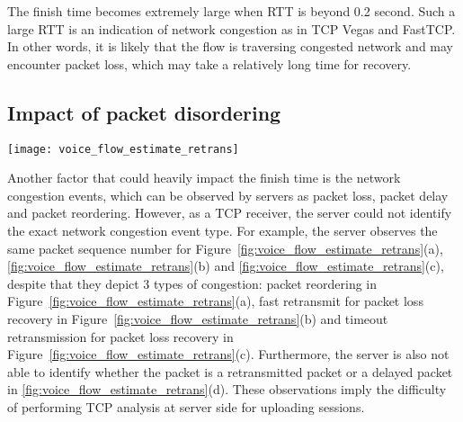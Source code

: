 The finish time becomes extremely large when RTT is beyond 0.2 second. Such a large RTT is an indication of network congestion as in TCP Vegas\cite{brakmo1995tcp} and FastTCP\cite{wei2006fast}. In other words, it is likely that the flow is traversing congested network and may encounter packet loss, which may take a relatively long time for recovery.

\subsection{Impact of packet disordering}
\label{sec:v_pd}


\begin{figure*}[th]
\centering
	\texttt{[image: voice\_flow\_estimate\_retrans]}
\caption{Server could not distinguish packet reordering events, which are (a) network reordering, (b) fast retransmit, and (c) timeout retransmission. Server may identify some timeout retransmissions as long packet delay (d).}
\label{fig:voice_flow_estimate_retrans}
\end{figure*}

Another factor that could heavily impact the finish time is the network congestion events, which can be observed by servers as packet loss, packet delay and packet reordering. However, as a TCP receiver, the server could not identify the exact network congestion event type. For example, the server observes the same packet sequence number for Figure~\ref{fig:voice_flow_estimate_retrans}(a), \ref{fig:voice_flow_estimate_retrans}(b) and \ref{fig:voice_flow_estimate_retrans}(c), despite that they depict 3 types of congestion: packet reordering in Figure~\ref{fig:voice_flow_estimate_retrans}(a), fast retransmit for packet loss recovery in Figure~\ref{fig:voice_flow_estimate_retrans}(b) and timeout retransmission for packet loss recovery in Figure~\ref{fig:voice_flow_estimate_retrans}(c). Furthermore, the server is also not able to identify whether the packet is a retransmitted packet or a delayed packet in \ref{fig:voice_flow_estimate_retrans}(d). These observations imply the difficulty of performing TCP analysis at server side for uploading sessions. 



